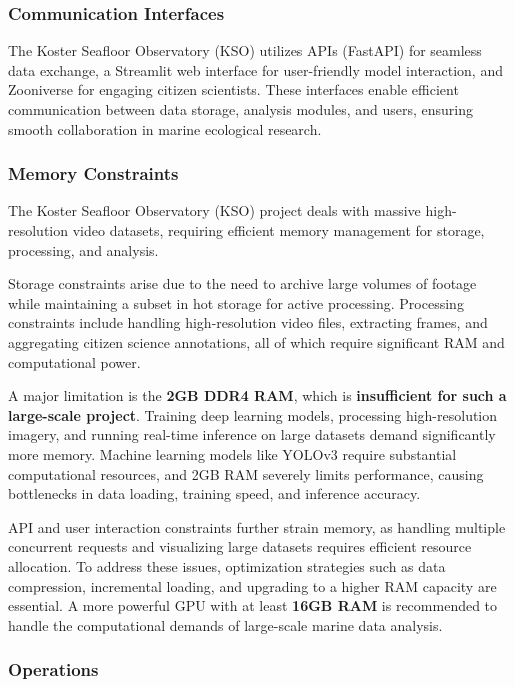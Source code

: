 \subsubsection{Communication Interfaces}

The Koster Seafloor Observatory (KSO) utilizes APIs (FastAPI) for seamless data exchange, a Streamlit web interface for user-friendly model interaction, and Zooniverse for engaging citizen scientists. These interfaces enable efficient communication between data storage, analysis modules, and users, ensuring smooth collaboration in marine ecological research.

\subsubsection{Memory Constraints}

The Koster Seafloor Observatory (KSO) project deals with massive high-resolution video datasets, requiring efficient memory management for storage, processing, and analysis. 

Storage constraints arise due to the need to archive large volumes of footage while maintaining a subset in hot storage for active processing. Processing constraints include handling high-resolution video files, extracting frames, and aggregating citizen science annotations, all of which require significant RAM and computational power.

A major limitation is the \textbf{2GB DDR4 RAM}, which is \textbf{insufficient for such a large-scale project}. Training deep learning models, processing high-resolution imagery, and running real-time inference on large datasets demand significantly more memory. Machine learning models like YOLOv3 require substantial computational resources, and 2GB RAM severely limits performance, causing bottlenecks in data loading, training speed, and inference accuracy.

API and user interaction constraints further strain memory, as handling multiple concurrent requests and visualizing large datasets requires efficient resource allocation. To address these issues, optimization strategies such as data compression, incremental loading, and upgrading to a higher RAM capacity are essential. A more powerful GPU with at least \textbf{16GB RAM} is recommended to handle the computational demands of large-scale marine data analysis.


\subsubsection{Operations}


